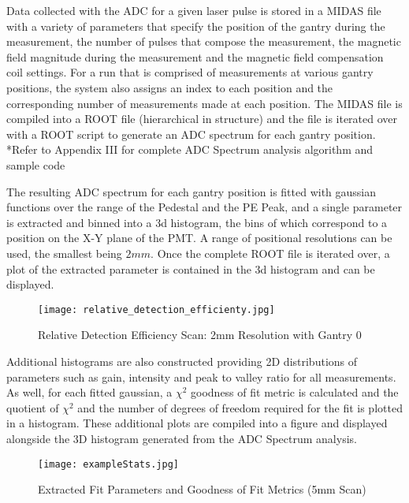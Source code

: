 \documentclass[journal]{IEEEtran}
\begin{document}
Data collected with the ADC for a given laser pulse is stored in a MIDAS file with a variety of parameters that specify the position of the gantry during the measurement, the number of pulses that compose the measurement, the magnetic field magnitude during the measurement and the magnetic field compensation coil settings.  For a run that is comprised of measurements at various gantry positions, the system also assigns an index to each position and the corresponding number of measurements made at each position.  The MIDAS file is compiled into a ROOT file (hierarchical in structure) and the file is iterated over with a ROOT script to generate an ADC spectrum for each gantry position. 
*Refer to Appendix III for complete ADC Spectrum analysis algorithm and sample code

The resulting ADC spectrum for each gantry position is fitted with gaussian functions over the range of the Pedestal and the PE Peak, and a single parameter is extracted and binned into a 3d histogram, the bins of which correspond to a position on the X-Y plane of the PMT.  A range of positional resolutions can be used, the smallest being $2mm$. Once the complete ROOT file is iterated over, a plot of the extracted parameter is contained in the 3d histogram and can be displayed.  

\FloatBarrier

\begin{figure}[ht]
	\centering	
	\texttt{[image: relative\_detection\_efficienty.jpg]}
	\caption{Relative Detection Efficiency Scan: 2mm Resolution with Gantry 0}
\end{figure}

\FloatBarrier

Additional histograms are also constructed providing 2D distributions of parameters such as gain, intensity and peak to valley ratio for all measurements. As well, for each fitted gaussian, a $\chi^2$ goodness of fit metric is calculated and the quotient of $\chi^2$ and the number of degrees of freedom required for the fit is plotted in a histogram.  These additional plots are compiled into a figure and displayed alongside the 3D histogram generated from the ADC Spectrum analysis.      
\vskip 0.05in

\FloatBarrier

\begin{figure}[!htpb]
	\centering	
	\texttt{[image: exampleStats.jpg]}
	\caption{Extracted Fit Parameters and Goodness of Fit Metrics (5mm Scan)}
	
\end{figure}
\end{document}
